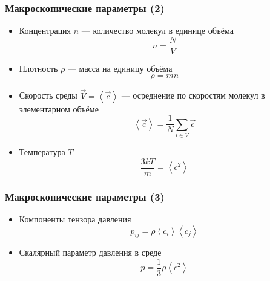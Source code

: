 \documentclass[onlymath]{beamer}
\newcommand\avg[1]{\left\langle{#1}\right\rangle}
\begin{document}
\begin{frame}
  \frametitle{Макроскопические параметры (2)}
  \begin{itemize}
  \item Концентрация $n$ — количество молекул в единице объёма
    \begin{equation*}
      n = \frac{N}{V}
    \end{equation*}
  \item Плотность $\rho$ — масса на единицу объёма
    \begin{equation*}
      \rho = m n
    \end{equation*}
  \item Скорость среды $\vec{V}=\avg{\vec{c}}$ — осреднение по скоростям молекул в
    элементарном объёме
    \begin{equation*}
      \avg{\vec{c}} = \frac{1}{N}\sum_{i \in V}{\vec{c}}
    \end{equation*}
  \item Температура $T$
    \begin{equation*}
      \frac{3kT}{m} = \avg{c^2}
    \end{equation*}
  \end{itemize}
\end{frame}

\begin{frame}
  \frametitle{Макроскопические параметры (3)}
  \begin{itemize}
  \item Компоненты тензора давления
    \begin{equation*}
      p_{ij} = \rho \avg{c_i} \avg{c_j}
    \end{equation*}
  \item Скалярный параметр давления в среде
    \begin{equation*}
      p = \frac{1}{3}\rho\avg{c^2}
    \end{equation*}
  \end{itemize}
\end{frame}
\end{document}
